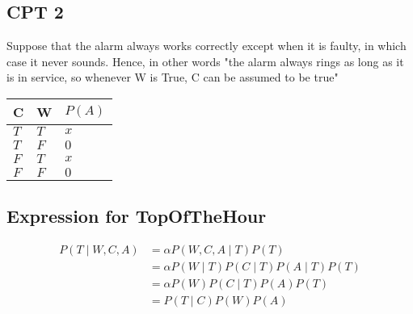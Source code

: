 \documentclass[12pt,a4paper]{article}
\begin{document}
\subsection{CPT 2}
Suppose that the alarm always works correctly except when it is faulty, in which
case it never sounds. Hence, in other words "the alarm always rings as long as it is in service, so whenever W is True, C can be assumed to be true"
\begin{table}[h]
\centering
\begin{tabular}{|l|l|l|}
\hline
C & W  & $P(A)$ \\ \hline
$T$    & $T$     &  $x $         \\ \hline
$T$     & $F$   &    $0$       \\ \hline
$F$    & $T$     &   $x$        \\ \hline
$F$    & $F$    &   $0$         \\ \hline
\end{tabular}
\end{table}

\subsection{Expression for TopOfTheHour}
\begin{equation}
\begin{aligned}
P(T \mid W, C, A) &= \alpha P (W, C, A \mid T) P(T) \\
&= \alpha P (W \mid T) P (C \mid T) P (A \mid T) P(T) \\
&= \alpha P(W) P(C \mid T) P (A) P(T) \\
&= P(T \mid C) P(W) P (A) 
\end{aligned}
\end{equation}
\end{document}

